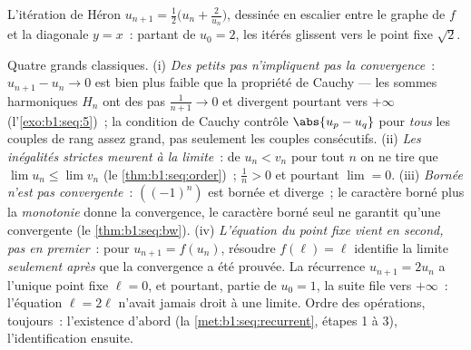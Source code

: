 \begin{omfigure}

{\small L'itération de Héron $u_{n+1} = \frac12\bigl(u_n +
\frac{2}{u_n}\bigr)$, dessinée en escalier entre le graphe de $f$ et
la diagonale $y = x$~: partant de $u_0 = 2$, les itérés glissent vers
le point fixe $\sqrt 2$.}
\end{omfigure}

\begin{remark}
Quatre grands classiques. (i) \emph{Des petits pas n'impliquent pas
la convergence}~: $u_{n+1} - u_n \to 0$ est bien plus faible que la
propriété de Cauchy --- les sommes harmoniques $H_n$ ont des pas
$\frac{1}{n+1} \to 0$ et divergent pourtant vers $+\infty$
(l'\cref{exo:b1:seq:5})~; la condition de Cauchy contrôle $\abs{u_p -
u_q}$ pour \emph{tous} les couples de rang assez grand, pas
seulement les couples consécutifs. (ii) \emph{Les inégalités strictes
meurent à la limite}~: de $u_n < v_n$ pour tout $n$ on ne tire que
$\lim u_n \leq \lim v_n$ (le \cref{thm:b1:seq:order})~; $\frac1n > 0$
et pourtant $\lim = 0$. (iii) \emph{Bornée n'est pas convergente}~:
$((-1)^n)$ est bornée et diverge~; le caractère borné plus la
\emph{monotonie} donne la convergence, le caractère borné seul ne
garantit qu'une  convergente (le
\cref{thm:b1:seq:bw}). (iv) \emph{L'équation du point fixe vient en
second, pas en premier}~: pour $u_{n+1} = f(u_n)$, résoudre $f(\ell)
= \ell$ identifie la limite \emph{seulement après} que la convergence
a été prouvée. La récurrence $u_{n+1} = 2u_n$ a l'unique point fixe
$\ell = 0$, et pourtant, partie de $u_0 = 1$, la suite file vers
$+\infty$~: l'équation $\ell = 2\ell$ n'avait jamais droit à une
limite. Ordre des opérations, toujours~: l'existence d'abord (la
\cref{met:b1:seq:recurrent}, étapes 1 à 3), l'identification ensuite.
\end{remark}

